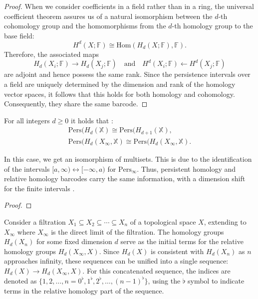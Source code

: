 \begin{proof}
When we consider coefficients in a field rather than in a ring, the universal coefficient theorem assures us of a natural isomorphism between the $d$-th cohomology group and the homomorphisms from the $d$-th homology group to the base field:
\begin{equation}
H^d(X;\mathbb{F}) \cong \text{Hom}(H_d(X;\mathbb{F}),\mathbb{F}).
\end{equation}
Therefore, the associated maps
\begin{equation}
H_d(X_i;\mathbb{F}) \rightarrow H_d(X_j;\mathbb{F}) \quad \text{and} \quad H^d(X_i;\mathbb{F}) \leftarrow H^d(X_j;\mathbb{F})
\end{equation}
are adjoint and hence possess the same rank. Since the persistence intervals over a field are uniquely determined by the dimension and rank of the homology vector spaces, it follows that this holds for both homology and cohomology. Consequently, they share the same barcode.
\end{proof}

\begin{theorem}
For all integers $d \geq 0$ it holds that \cite[§2.4]{de2011dualities}:
\begin{align*}
	\text{Pers}(H_d(\mathbb{X}) \cong \text{Pers}(H_{d+1}(\mathbb{X}), \\
	\text{Pers}(H_d(X_\infty, \mathbb{X}) \cong \text{Pers}(H_d(X_\infty, \mathbb{X}).
\end{align*}
\end{theorem}

\begin{remark}
In this case, we get an isomorphism of multisets. This is due to the identification of the intervals $[a,\infty) \leftrightarrow [-\infty, a)$ for $\text{Pers}_\infty$. Thus, persistent homology and relative homology barcodes carry the same information, with a dimension shift for the finite intervals \cite[§2.4]{de2011dualities}.
\end{remark}

\begin{proof}

\end{proof}

Consider a filtration $X_1 \subseteq X_2 \subseteq \cdots \subseteq X_n$ of a topological space $X$, extending to $X_\infty$ where $X_\infty$ is the direct limit of the filtration. The homology groups $H_d(X_n)$ for some fixed dimension $d$ serve as the initial terms for the relative homology groups $H_d(X_\infty, X)$. Since $H_d(X)$ is consistent with $H_d(X_n)$ as $n$ approaches infinity, these sequences can be unified into a single sequence: $H_d(X) \to H_d(X_\infty, X)$. For this concatenated sequence, the indices are denoted as $\{1, 2, \ldots, n = 0^\flat, 1^\flat, 2^\flat, \ldots, (n-1)^\flat\}$, using the $\flat$ symbol to indicate terms in the relative homology part of the sequence.

